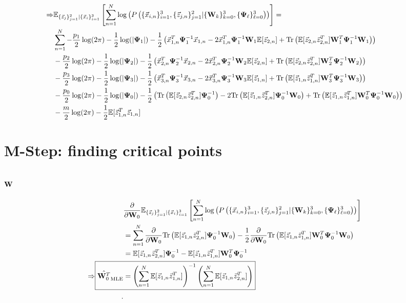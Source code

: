 \begin{landscape}
\newcommand{\ecll}{\ev_{\{ \z_j\}_{j=1}^2 | \{\x_i\}_{i=1}^3}
  \left[ \sum_{n=1}^N \log \left( \fulljointp \right) \right] }
\begin{equation}
\begin{split}
\Rightarrow & \ecll= \\
& \sum_{n=1}^N - \frac{p_1}{2} \log (2\pi) - \frac{1}{2} \log( |\bpsi_1| ) -
\frac{1}{2} \left(
  \x_{1,n}^T \bpsi_1^{-1} \x_{1,n} - 2 \x_{1,n}^T    \bpsi_1^{-1} \W_1 \ev[ \z_{2,n}] +
  \Tr \left( \ev[\z_{2,n} \z_{2,n}^T ] \W_1^T  \bpsi_1^{-1}
    \W_1\right) \right)\\
& - \frac{p_2}{2} \log (2\pi) - \frac{1}{2} \log( |\bpsi_2| ) -
\frac{1}{2} \left(
\x_{2,n}^T \bpsi_2^{-1} \x_{2,n} - 2 \x_{2,n}^T    \bpsi_2^{-1} \W_2 \ev[\z_{2,n}] +
  \Tr \left( \ev[\z_{2,n} \z_{2,n}^T ] \W_2^T  \bpsi_2^{-1}
    \W_2\right) \right)\\
& - \frac{p_3}{2} \log (2\pi) - \frac{1}{2} \log( |\bpsi_3| ) -
\frac{1}{2} \left(
\x_{3,n}^T \bpsi_3^{-1} \x_{3,n} - 2 \x_{3,n}^T    \bpsi_3^{-1} \W_3 \ev[\z_{1,n} ]+
  \Tr \left( \ev[\z_{1,n} \z_{1,n}^T ] \W_3^T  \bpsi_3^{-1}
    \W_3\right) \right)\\
& - \frac{p_0}{2} \log (2\pi) - \frac{1}{2} \log( |\bpsi_0| ) -
\frac{1}{2} \left(
\Tr \left( \ev [\z_{2,n} \z_{2,n}^T] \bpsi_0^{-1} \right)  - 2 \Tr \left( \ev[\z_{1,n}\z_{2,n}^T]
  \bpsi_0^{-1} \W_0 \right) +
  \Tr \left( \ev[\z_{1,n} \z_{1,n}^T ] \W_0^T  \bpsi_0^{-1}
    \W_0\right) \right)\\
& -\frac{m}{2} \log( 2 \pi) - \frac{1}{2} \ev [ \z_{1,n}^T \z_{1,n}]
\end{split}
\end{equation}
\end{landscape}
\pagebreak
\section{M-Step: finding critical points}
\subsection{$\bold{W}$}

\begin{align*}
  &\frac{  \partial }{\partial \W_0} \ecll \\
  &=  \sum_{n=1}^N \frac{\partial}{\partial \W_0} \Tr \left(\ev [\z_{1,n} \z_{2,n}^T]
      \bpsi_0^{-1} \W_0 \right) - \frac{1}{2} \frac{\partial}{\partial
      \W_0 }\Tr \left( \ev [ \z_{1,n}
    \z_{1,n}^T] \W_0^T \bpsi_0^{-1} \W_0 \right) \\
  &=  \ev [\z_{1,n} \z_{2,n}^T] \bpsi_0^{-1} - \ev [\z_{1,n} \z_{1,n}^T] \W_0^T
    \bpsi_0^{-1}\\
   \Rightarrow \Aboxed{ \hat{\W_0^T}_{\text{MLE}} &= \left(
                                                    \sum_{n=1}^N \ev [\z_{1,n} \z_{1,n}^T]
      \right)^{-1} \left( \sum_{n=1}^N \ev [\z_{1,n} \z_{2,n}^T] \right)}\\
.\end{align*}


